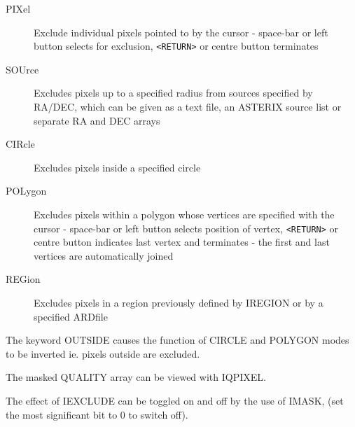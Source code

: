 \documentclass{book}
\renewcommand{\_}{{\tt\char'137}}     %
\begin{document}
 
\begin{description}
\item[PIXel]
Exclude individual pixels pointed to by the
cursor - space-bar or left button selects
for exclusion, \verb+<RETURN>+ or centre button
terminates
\item[SOUrce]
Excludes pixels up to a specified radius from
sources specified by RA/DEC, which can be given
as a text file, an ASTERIX source list or separate
RA and DEC arrays
\item[CIRcle]
Excludes pixels inside a specified circle
\item[POLygon]
Excludes pixels within a polygon whose vertices
are specified with the cursor - space-bar or
left button selects position of vertex, \verb+<RETURN>+
or centre button indicates last vertex and
terminates - the first and last vertices are
automatically joined
\item[REGion]
Excludes pixels in a region previously defined
by IREGION or by a specified ARDfile
\end{description}
The keyword OUTSIDE causes the function of CIRCLE and POLYGON modes
to be inverted ie. pixels outside are excluded.
 
The masked QUALITY array can be viewed with IQPIXEL.
 
The effect of IEXCLUDE can be toggled on and off by the use of
IMASK, (set the most significant bit to 0 to switch off).
 
\end{document}
